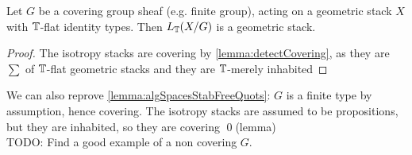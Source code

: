 \begin{corollary}
	 Let $G$ be a covering group sheaf (e.g. finite group), acting on a geometric stack $X$ with  $\mathbb{T}$-flat identity types. Then $L_{\mathbb{T}} (X / G)$ is a geometric stack.
\end{corollary}
\begin{proof}
	The isotropy stacks are covering by \ref{lemma:detectCovering}, as they are $\sum$ of $\mathbb{T}$-flat geometric stacks and they are $\mathbb{T}$-merely inhabited 
\end{proof}
We can also reprove \ref{lemma:algSpacesStabFreeQuots}: $G$ is a finite type by assumption, hence covering. The isotropy stacks are assumed to be propositions, but they are inhabited, so they are covering \qed(lemma) \\

TODO: Find a good example of a non covering $G$.